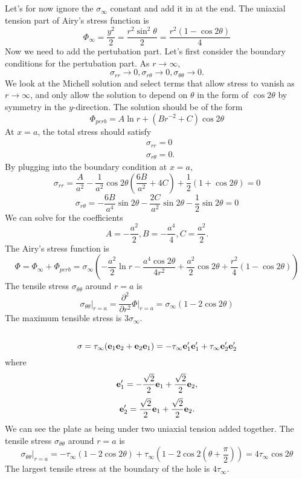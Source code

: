 \documentclass[12pt]{article}
\newcommand{\ee}{{\bf e}}
\newcommand{\pr}{{\partial}}
\begin{document}
\subsection{}
Let's for now ignore the $\sigma_{\infty}$ constant and add it in at the end. The uniaxial tension part of Airy's stress function is
\[
\Phi_{\infty} = \frac{y^2}{2} =\frac{r^2\sin^2\theta}{2} = \frac{r^2(1-\cos2\theta)}{4}
\]
Now we need to add the pertubation part.
Let's first consider the boundary conditions for the pertubation part. As $r\to\infty$,
\[
\sigma_{rr} \to 0,  \sigma_{r\theta} \to 0,  \sigma_{\theta\theta} \to 0.
\]
We look at the Michell solution and select terms that allow stress to vanish as $r\to\infty$, and only allow the solution to depend on $\theta$ in the form of $\cos2\theta$ by symmetry
in the $y$-direction. The solution should be of the form
\[
\Phi_{perb} = A\ln r + (Br^{-2} + C)\cos2\theta
\]
At $x=a$, the total stress should satisfy
\begin{align*}
 & \sigma_{rr} = 0\\
 & \sigma_{r\theta} =0.
\end{align*}
By plugging into the boundary condition at $x=a$, 
\[
\sigma_{rr} = \frac{A}{a^2} - \frac{1}{a^2}\cos2\theta(\frac{6B}{a^2} + 4C) + \frac 1 2(1+\cos2\theta)=0
\]
\[
\sigma_{r\theta} = -\frac{6B}{a^4}\sin2\theta - \frac{2C}{a^2}\sin2\theta - \frac 1 2 \sin2\theta=0
\]
We can solve for the coefficients
\[
A = -\frac{a^2}{2}, B = -\frac{a^4}{4}, C = \frac{a^2}{2}.
\]
The Airy's stress function is
\[
\Phi = \Phi_{\infty} + \Phi_{perb} = \sigma_{\infty} (-\frac{a^2}{2} \ln r -\frac{a^4\cos2\theta}{4r^2} + \frac{a^2}{2}\cos2\theta+ \frac{r^2}{4}(1-\cos2\theta))
\]
The tensile stress $\sigma_{\theta\theta}$ around $r=a$ is
\[
\sigma_{\theta\theta} \rvert_{r=a}= \frac{\pr^2}{\pr r^2} \Phi\rvert_{r=a}  = \sigma_{\infty}(1-2\cos2\theta)
\]
The maximum tensible stress is $3\sigma_{\infty}$.


\subsection{}
\[
\sigma = \tau_{\infty}(\ee_1\ee_2 + \ee_2 \ee_1) = -\tau_{\infty}\ee_1'\ee_1'+ \tau_{\infty}\ee_2'\ee_2'
\]
where
\[
\ee_1' = -\frac{\sqrt 2}{2}\ee_1 + \frac{\sqrt 2}{2}\ee_2, 
\]
\[
\ee_2' = \frac{\sqrt 2}{2}\ee_1 + \frac{\sqrt 2}{2}\ee_2.
\]
We can see the plate as being under two uniaxial tension added together.
The tensile stress $\sigma_{\theta\theta}$ around $r=a$ is
\[
\sigma_{\theta\theta} \rvert_{r=a}= -\tau_{\infty}(1-2\cos2\theta) + \tau_{\infty}(1-2\cos2(\theta+\frac \pi 2)) = 4\tau_{\infty}\cos 2\theta
\]
The largest tensile stress at the boundary of the hole is $4\tau_{\infty}$.
\end{document}
